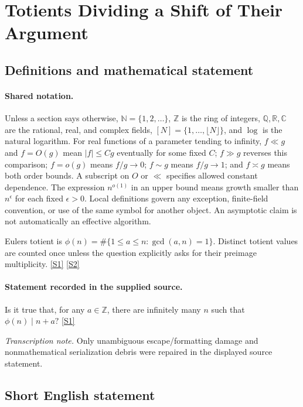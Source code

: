 \documentclass[11pt,a4paper]{article}
\newcommand{\N}{\mathbb{N}}
\newcommand{\Z}{\mathbb{Z}}
\newcommand{\Q}{\mathbb{Q}}
\newcommand{\R}{\mathbb{R}}
\newcommand{\C}{\mathbb{C}}
\newcommand{\sref}[2]{\hyperlink{source:#1:#2}{[S#2]}}
\begin{document}
\section{Totients Dividing a Shift of Their Argument}\label{statement}


\subsection{Definitions and mathematical statement}

\paragraph{Shared notation.}Unless a section says otherwise, $\N=\{1,2,\ldots\}$,
$\Z$ is the ring of integers, $\Q,\R,\C$ are the rational, real, and complex
fields, $[N]=\{1,\ldots,\lfloor N\rfloor\}$, and $\log$ is the natural
logarithm. For real functions of a parameter tending to infinity,
$f\ll g$ and $f=O(g)$ mean $|f|\leq Cg$ eventually for some fixed $C$;
$f\gg g$ reverses this comparison; $f=o(g)$ means $f/g\to0$;
$f\sim g$ means $f/g\to1$; and $f\asymp g$ means both order bounds.
A subscript on $O$ or $\ll$ specifies allowed constant dependence.
The expression $n^{o(1)}$ in an upper bound means growth smaller than
$n^\epsilon$ for each fixed $\epsilon>0$. Local definitions govern any
exception, finite-field convention, or use of the same symbol for another
object. An asymptotic claim is not automatically an effective algorithm.



Euler\textquotesingle s totient is $\phi(n)=\#\{1\leq a\leq n:\gcd(a,n)=1\}$. Distinct totient values are counted once unless the question explicitly asks for their preimage multiplicity. \sref{statement}{1} \sref{statement}{2}

\paragraph{Statement recorded in the supplied source.}
Is it true that, for any $a\in\mathbb{Z}$, there are infinitely many $n$ such that $ \phi(n) \mid n+a? $ \sref{statement}{1}

{\small\emph{Transcription note.} Only unambiguous escape/formatting damage and nonmathematical serialization debris were repaired in the displayed source statement.}

\subsection{Short English statement}
\end{document}
